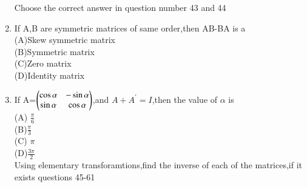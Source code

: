 \begin{enumerate}[label=\arabic*.,ref=\thesubsection.\theenumi]
  Choose the correct answer in question number 43 and 44\\
  \item If A,B are symmetric matrices of same order,then AB-BA is a\\
  (A)Skew symmetric matrix \\(B)Symmetric matrix\\
  (C)Zero matrix \\ (D)Identity matrix\\
  \item If A=$\begin{pmatrix}\cos\alpha &-\sin\alpha\\ \sin\alpha &\cos\alpha\end{pmatrix}$,and $A+A^{'}=I$,then the value of $\alpha$ is\\
  (A) $\frac{\pi}{6}$\\ (B)$\frac{\pi}{3}$ \\
  (C) $\pi$ \\ (D)$\frac{3\pi}{2}$\\
  
  Using elementary transforamtions,find the inverse of each of the matrices,if it exists questions 45-61\\
  

\end{enumerate}
